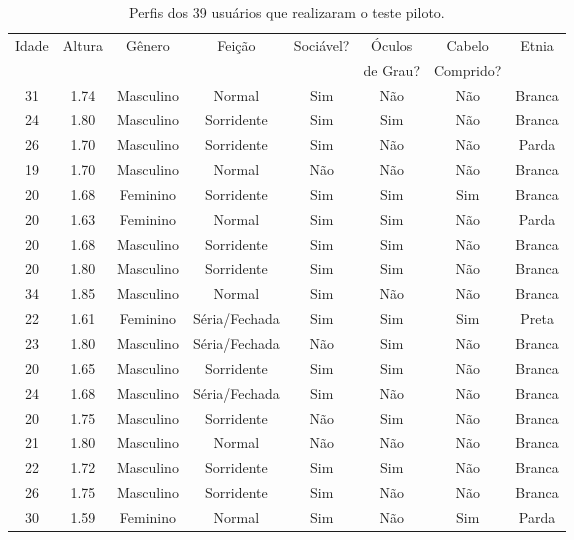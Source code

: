 \begin{table}[!ht]
	\caption{Perfis dos 39 usuários que realizaram o teste piloto.}
	\label{tab:perfilamostra}
	\centering
	\begin{tabular}{c | c | c | c | c | c | c | c}
        \hline
        Idade & Altura & Gênero & Feição & Sociável? & Óculos & Cabelo & Etnia \\
         &  &  &  &  & de Grau? & Comprido? &  \\ \hline
        31 & 1.74 & Masculino & Normal & Sim & Não & Não & Branca \\ \hline
        24 & 1.80 & Masculino & Sorridente & Sim & Sim & Não & Branca \\ \hline
        26 & 1.70 & Masculino & Sorridente & Sim & Não & Não & Parda \\ \hline
        19 & 1.70 & Masculino & Normal & Não & Não & Não & Branca \\ \hline
        20 & 1.68 & Feminino  & Sorridente & Sim & Sim & Sim & Branca \\ \hline
        20 & 1.63 & Feminino  & Normal & Sim & Sim & Não & Parda \\ \hline
        20 & 1.68 & Masculino & Sorridente & Sim & Sim & Não & Branca \\ \hline
        20 & 1.80 & Masculino & Sorridente & Sim & Sim & Não & Branca \\ \hline
        34 & 1.85 & Masculino & Normal & Sim & Não & Não & Branca \\ \hline
        22 & 1.61 & Feminino  & Séria/Fechada & Sim & Sim & Sim & Preta \\ \hline
        23 & 1.80 & Masculino & Séria/Fechada & Não & Sim & Não & Branca \\ \hline
        20 & 1.65 & Masculino & Sorridente & Sim & Sim & Não & Branca \\ \hline
        24 & 1.68 & Masculino & Séria/Fechada & Sim & Não & Não & Branca \\ \hline
        20 & 1.75 & Masculino & Sorridente & Não & Sim & Não & Branca \\ \hline
        21 & 1.80 & Masculino & Normal & Não & Não & Não & Branca \\ \hline
        22 & 1.72 & Masculino & Sorridente & Sim & Sim & Não & Branca \\ \hline
        26 & 1.75 & Masculino & Sorridente & Sim & Não & Não & Branca \\ \hline
        30 & 1.59 & Feminino  & Normal & Sim & Não & Sim & Parda \\ \hline

\end{tabular}
\end{table}
